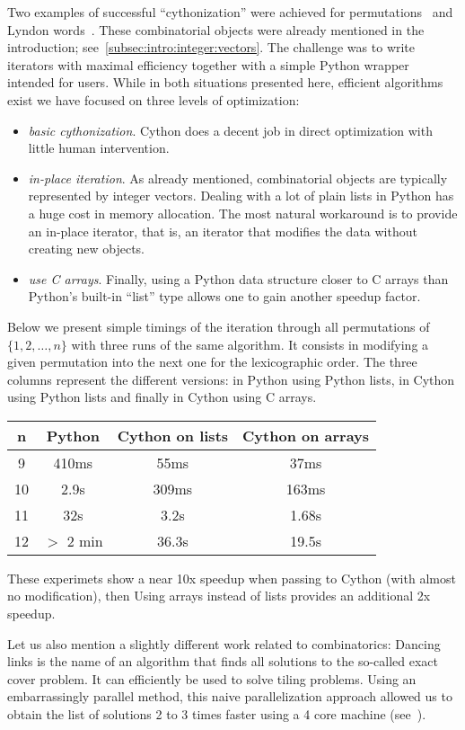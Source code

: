 \documentclass{deliverablereport}
\begin{document}
Two examples of successful ``cythonization'' were achieved for
permutations~\cite{trac-23734} and Lyndon words~\cite{trac-26111}.
These combinatorial objects were already mentioned in the
introduction; see~\ref{subsec:intro:integer:vectors}.
The challenge was to write iterators with maximal efficiency
together with a simple Python wrapper intended for \Sage users.
While in both situations presented here, efficient algorithms exist
we have focused on three levels of optimization:
\begin{itemize}
\item \textit{basic cythonization}. Cython does a decent job in
direct optimization with little human intervention. 
\item \textit{in-place iteration}. As already mentioned, combinatorial objects are typically represented by
integer vectors. Dealing with a lot of plain lists in Python has a huge
cost in memory allocation. The most natural workaround is to provide an in-place
iterator, that is, an iterator that modifies the data without creating new objects.
\item \textit{use C arrays}. Finally, using a Python data structure closer to C
arrays than Python's built-in ``list'' type allows one to gain another speedup factor.
\end{itemize}
Below we present simple timings of the iteration through all permutations
of $\{1, 2, \ldots, n\}$ with three runs of the same algorithm. It consists
in modifying a given permutation into the next one for the lexicographic
order. The three columns represent the different versions: in Python
using Python lists, in Cython using Python lists and finally in Cython
using C arrays.
  \begin{center}
\begin{tabular}{c|c|c|c}
    n & Python & Cython on lists & Cython on arrays \\
\hline
9  & 410ms   & 55ms  & 37ms \\
10 & 2.9s    & 309ms & 163ms \\
11 & 32s     & 3.2s  & 1.68s \\
12 & $>$ 2 min & 36.3s & 19.5s \\
\end{tabular}
  \end{center}
These experimets show a near 10x speedup when passing to Cython (with almost no
modification), then Using arrays instead of lists provides an additional 2x speedup.

Let us also mention a slightly different work related to combinatorics:
Dancing links is the name of an algorithm that finds all solutions to
the so-called exact cover problem. It can efficiently be used to
solve tiling problems. Using an embarrassingly parallel method,
this naive parallelization approach allowed us to obtain the list
of solutions 2 to 3 times faster using a 4 core machine
(see~\cite{trac-25125}).
\end{document}

